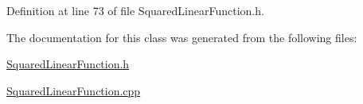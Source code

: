 Definition at line 73 of file Squared\+Linear\+Function.\+h.



The documentation for this class was generated from the following files\+:\begin{DoxyCompactItemize}
\item 
\hyperlink{SquaredLinearFunction_8h}{Squared\+Linear\+Function.\+h}\item 
\hyperlink{SquaredLinearFunction_8cpp}{Squared\+Linear\+Function.\+cpp}\end{DoxyCompactItemize}
